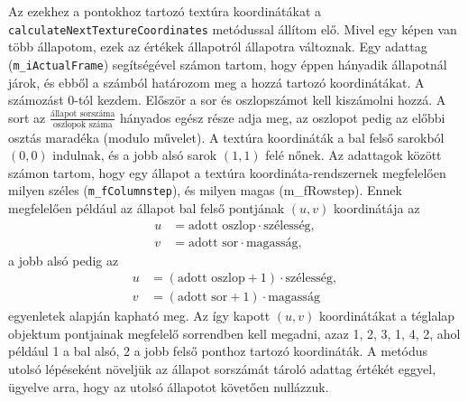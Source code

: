 Az ezekhez a pontokhoz tartozó textúra koordinátákat a \texttt{calculateNextTextureCoordinates} metódussal állítom elő. Mivel egy képen van több állapotom, ezek az értékek állapotról állapotra változnak. Egy adattag (\texttt{m\_iActualFrame}) segítségével számon tartom, hogy éppen hányadik állapotnál járok, és ebből a számból határozom meg a hozzá tartozó koordinátákat. A számozást 0-tól kezdem. Először a sor és oszlopszámot kell kiszámolni hozzá. A sort az $\frac{\text{állapot sorszáma}}{\text{oszlopok száma}}$ hányados egész része adja meg, az oszlopot pedig az előbbi osztás maradéka (modulo művelet). A textúra koordináták a bal felső sarokból $(0, 0)$ indulnak, és a jobb alsó sarok $(1, 1)$ felé nőnek. Az adattagok között számon tartom, hogy egy állapot a textúra koordináta-rendszernek megfelelően milyen széles (\texttt{m\_fColumnstep}), és milyen magas (m\_fRowstep). Ennek megfelelően például az állapot bal felső pontjának $(u, v)$ koordinátája az 
\begin{align*}
u &= \text{adott oszlop} \cdot \text{szélesség}, \\
v &= \text{adott sor} \cdot \text{magasság}, 
\end{align*}
a jobb alsó pedig az  
\begin{align*}
u &= (\text{adott oszlop} + 1) \cdot \text{szélesség}, \\
v &= (\text{adott sor} + 1) \cdot \text{magasság} 
\end{align*}
egyenletek alapján kapható meg. Az így kapott $(u, v)$ koordinátákat a téglalap objektum pontjainak megfelelő sorrendben kell megadni, azaz 1, 2, 3, 1, 4, 2, ahol például 1 a bal alsó, 2 a jobb felső ponthoz tartozó koordináták. A metódus utolsó lépéseként növeljük az állapot sorszámát tároló adattag értékét eggyel, ügyelve arra, hogy az utolsó állapotot követően nullázzuk.

